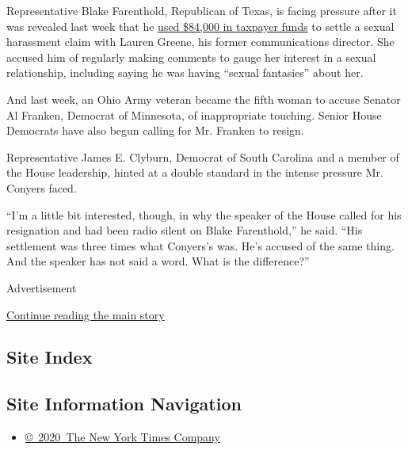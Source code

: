 Representative Blake Farenthold, Republican of Texas, is facing pressure
after it was revealed last week that he
\href{https://www.nytimes.com/2017/12/01/us/politics/farenthold-sexual-harassement-settlement-taxpayers-congress.html}{used
\$84,000 in taxpayer funds} to settle a sexual harassment claim with
Lauren Greene, his former communications director. She accused him of
regularly making comments to gauge her interest in a sexual
relationship, including saying he was having ``sexual fantasies'' about
her.

And last week, an Ohio Army veteran became the fifth woman to accuse
Senator Al Franken, Democrat of Minnesota, of inappropriate touching.
Senior House Democrats have also begun calling for Mr. Franken to
resign.

Representative James E. Clyburn, Democrat of South Carolina and a member
of the House leadership, hinted at a double standard in the intense
pressure Mr. Conyers faced.

``I'm a little bit interested, though, in why the speaker of the House
called for his resignation and had been radio silent on Blake
Farenthold,'' he said. ``His settlement was three times what Conyers's
was. He's accused of the same thing. And the speaker has not said a
word. What is the difference?''

Advertisement

\protect\hyperlink{after-bottom}{Continue reading the main story}

\hypertarget{site-index}{%
\subsection{Site Index}\label{site-index}}

\hypertarget{site-information-navigation}{%
\subsection{Site Information
Navigation}\label{site-information-navigation}}

\begin{itemize}
\tightlist
\item
  \href{https://help.nytimes.com/hc/en-us/articles/115014792127-Copyright-notice}{©~2020~The
  New York Times Company}
\end{itemize}

